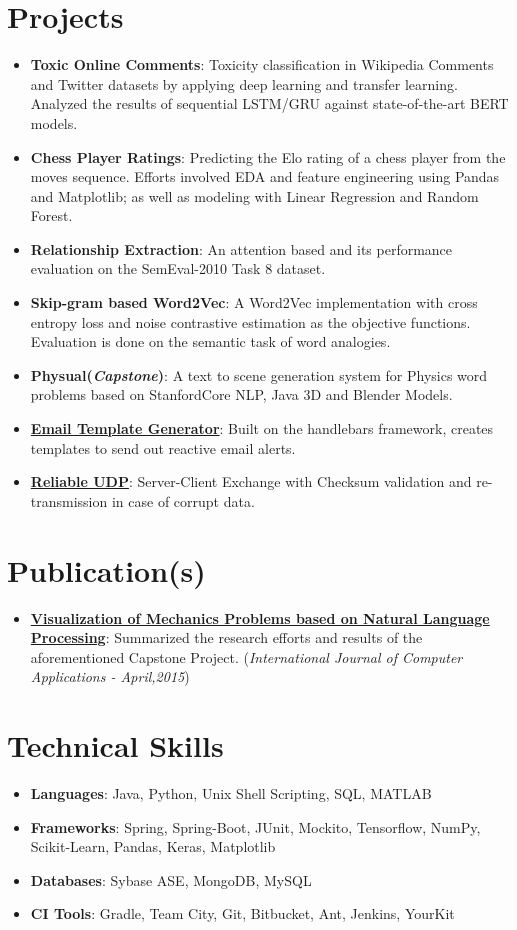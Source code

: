 \documentclass[letterpaper,11pt]{article}
\def\faFlask{\unichar{"F0C3}}
\def\aiGoogleScholar{\unichar{"E9D4}}
\def\faGears{\unichar{"F085}}
\newcommand{\resumeItem}[2]{
  \item\small{
    \textbf{#1}{: #2 \vspace{-2pt}}
  }
}
\newcommand{\resumeSubItem}[2]{\resumeItem{#1}{#2}\vspace{-4pt}}
\newcommand{\resumeSubHeadingListStart}{\begin{itemize}[leftmargin=*]}
\newcommand{\resumeSubHeadingListEnd}{\end{itemize}}
\begin{document}
  
\section{{\faFlask} Projects}
  \resumeSubHeadingListStart
  \resumeSubItem{Toxic Online Comments} {
   Toxicity classification in Wikipedia Comments and Twitter datasets by applying deep learning and transfer learning. Analyzed the results of sequential LSTM/GRU against state-of-the-art BERT models.}
   \resumeSubItem{Chess Player Ratings} {
     Predicting the Elo rating of a chess player from the moves sequence. Efforts involved EDA and feature engineering using Pandas and Matplotlib; as well as modeling with Linear Regression and Random Forest.}
   \resumeSubItem{Relationship Extraction}{An attention based and its performance evaluation on the SemEval-2010 Task 8 dataset.}
  \resumeSubItem{Skip-gram based Word2Vec}
      {A Word2Vec implementation with cross entropy loss and noise contrastive estimation as the objective functions. Evaluation is done on the semantic task of word analogies.}
  \resumeSubItem{Physual(\textit{Capstone})}
      {A text to scene generation system for Physics word problems based on StanfordCore NLP, Java 3D and Blender Models.}
  \resumeSubItem{\href{https://github.com/amanpreet692/HandleBarsEmailTemplate}
    {Email Template Generator}}
    {Built on the handlebars framework, creates templates to send out reactive email alerts.}       \resumeSubItem{\href{https://bitbucket.org/APS692/udp-with-error-detection} {Reliable UDP}}
      {Server-Client Exchange with Checksum validation and re-transmission in case of corrupt data.}
  \resumeSubHeadingListEnd

\section{{\aiGoogleScholar} Publication(s)}
  \resumeSubHeadingListStart
    \resumeSubItem{\href{http://research.ijcaonline.org/volume116/number14/pxc3902766.pdf}	{Visualization of Mechanics Problems based on Natural Language Processing}}
      {Summarized the research efforts and results of the aforementioned Capstone Project. (\textit{International Journal of Computer Applications - April,2015})}
      
\resumeSubHeadingListEnd

\section{{\faGears} Technical Skills}
 \resumeSubHeadingListStart
 \resumeSubItem{Languages}{Java, Python, Unix Shell Scripting, SQL, MATLAB}
 \resumeSubItem{Frameworks}{Spring, Spring-Boot, JUnit, Mockito, Tensorflow, NumPy, Scikit-Learn, Pandas, Keras, Matplotlib}
 \resumeSubItem{Databases}{Sybase ASE, MongoDB, MySQL}
 \resumeSubItem{CI Tools}{Gradle, Team City, Git, Bitbucket, Ant, Jenkins, YourKit}
 \resumeSubHeadingListEnd
\end{document}
